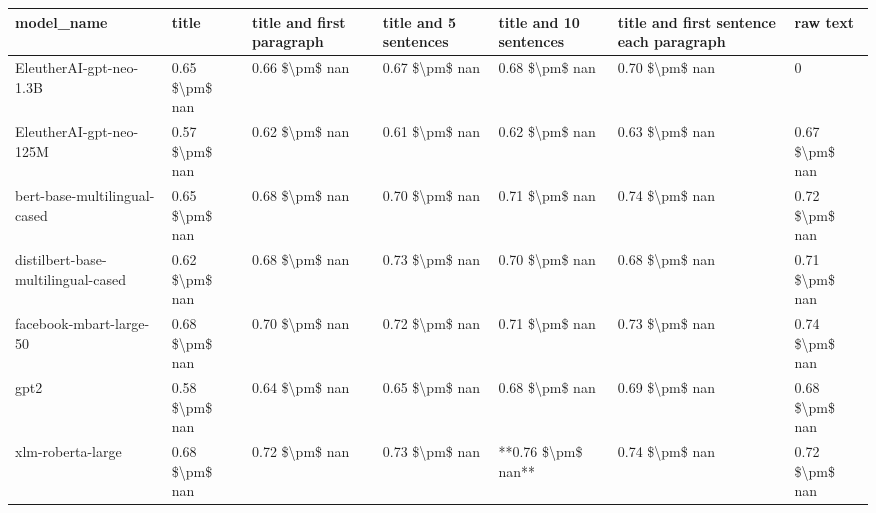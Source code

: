\begin{tabular}{lllllll}
\toprule
                        model\_name &          title & title and first paragraph & title and 5 sentences & title and 10 sentences & title and first sentence each paragraph &       raw text \\
\midrule
           EleutherAI-gpt-neo-1.3B & 0.65 \$\textbackslash pm\$ nan &            0.66 \$\textbackslash pm\$ nan &        0.67 \$\textbackslash pm\$ nan &         0.68 \$\textbackslash pm\$ nan &                          0.70 \$\textbackslash pm\$ nan &              0 \\
           EleutherAI-gpt-neo-125M & 0.57 \$\textbackslash pm\$ nan &            0.62 \$\textbackslash pm\$ nan &        0.61 \$\textbackslash pm\$ nan &         0.62 \$\textbackslash pm\$ nan &                          0.63 \$\textbackslash pm\$ nan & 0.67 \$\textbackslash pm\$ nan \\
      bert-base-multilingual-cased & 0.65 \$\textbackslash pm\$ nan &            0.68 \$\textbackslash pm\$ nan &        0.70 \$\textbackslash pm\$ nan &         0.71 \$\textbackslash pm\$ nan &                          0.74 \$\textbackslash pm\$ nan & 0.72 \$\textbackslash pm\$ nan \\
distilbert-base-multilingual-cased & 0.62 \$\textbackslash pm\$ nan &            0.68 \$\textbackslash pm\$ nan &        0.73 \$\textbackslash pm\$ nan &         0.70 \$\textbackslash pm\$ nan &                          0.68 \$\textbackslash pm\$ nan & 0.71 \$\textbackslash pm\$ nan \\
           facebook-mbart-large-50 & 0.68 \$\textbackslash pm\$ nan &            0.70 \$\textbackslash pm\$ nan &        0.72 \$\textbackslash pm\$ nan &         0.71 \$\textbackslash pm\$ nan &                          0.73 \$\textbackslash pm\$ nan & 0.74 \$\textbackslash pm\$ nan \\
                              gpt2 & 0.58 \$\textbackslash pm\$ nan &            0.64 \$\textbackslash pm\$ nan &        0.65 \$\textbackslash pm\$ nan &         0.68 \$\textbackslash pm\$ nan &                          0.69 \$\textbackslash pm\$ nan & 0.68 \$\textbackslash pm\$ nan \\
                 xlm-roberta-large & 0.68 \$\textbackslash pm\$ nan &            0.72 \$\textbackslash pm\$ nan &        0.73 \$\textbackslash pm\$ nan &     **0.76 \$\textbackslash pm\$ nan** &                          0.74 \$\textbackslash pm\$ nan & 0.72 \$\textbackslash pm\$ nan \\
\bottomrule
\end{tabular}
